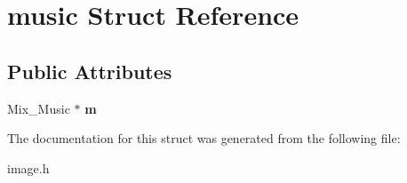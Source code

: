 \hypertarget{structmusic}{}\section{music Struct Reference}
\label{structmusic}
\subsection*{Public Attributes}
\begin{DoxyCompactItemize}
\item 
\mbox{\label{structmusic_a163ef3b25061659ab2a8edc74f01fa19}} 
Mix\+\_\+\+Music $\ast$ {\bfseries m}
\end{DoxyCompactItemize}


The documentation for this struct was generated from the following file\+:\begin{DoxyCompactItemize}
\item 
image.\+h\end{DoxyCompactItemize}
